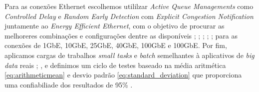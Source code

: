 Para as conexões Ethernet escolhemos utililzar \emph{Active Queue Managements} como \emph{Controlled Delay} e \emph{Random Early Detection} com \emph{Explicit Congestion Notification} juntamente ao \emph{Energy Efficient Ethernet}, com o objetivo de procurar as melhoreres combinações e configurações dentre as disponíveis \cite{alizadeh2010data}; \cite{christensen2010ieee}; \cite{bufferbloat}; \cite{ismaileffectiveness}; \cite{reviriego2010burst}; \cite{silva2018eon} para as conexões de 1GbE, 10GbE, 25GbE, 40GbE, 100GbE e 100GbE. Por fim, aplicamos cargas de trabalhos \emph{small tasks} e \emph{batch} semelhantes à aplicativos de \emph{big data} reais \cite{chen2011case}; \cite{chen2012interactive}, e definimos um ciclo de testes baseado na média aritmética \ref{eq:arithmeticmean} \cite{plackett1958studies} e desvio padrão \ref{eq:standard_deviation} \cite{brenner1988simple} que proporciona uma confiabiliade dos resultados de 95\% \cite{peck2015introduction}.